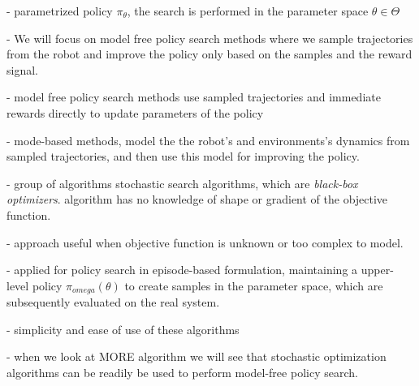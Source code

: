 - parametrized policy $\pi_{\theta}$, the search is performed in the parameter space
$\theta \in \Theta$

- We will focus on model free policy search methods where we sample trajectories from
the robot and improve the policy only based on the samples and the reward signal.

- model free policy search methods use sampled trajectories and immediate rewards directly
to update parameters of the policy

- mode-based methods, model the the robot's and environments's dynamics from sampled
  trajectories, and then use this model for improving the policy.

- group of algorithms stochastic search algorithms, which are \textit{black-box optimizers}.
algorithm has no knowledge of shape or gradient of the objective function.

- approach useful when objective function is unknown or too complex to model.

- applied for policy search in episode-based formulation, maintaining a upper-level policy
$\pi_{omega}(\theta)$ to create samples in the parameter space, which are
subsequently evaluated on the real system.

- simplicity and ease of use of these algorithms

- when we look at MORE algorithm we will see that stochastic optimization algorithms can
be readily be used to perform model-free policy search.
  
%
%
%
%
%
%

